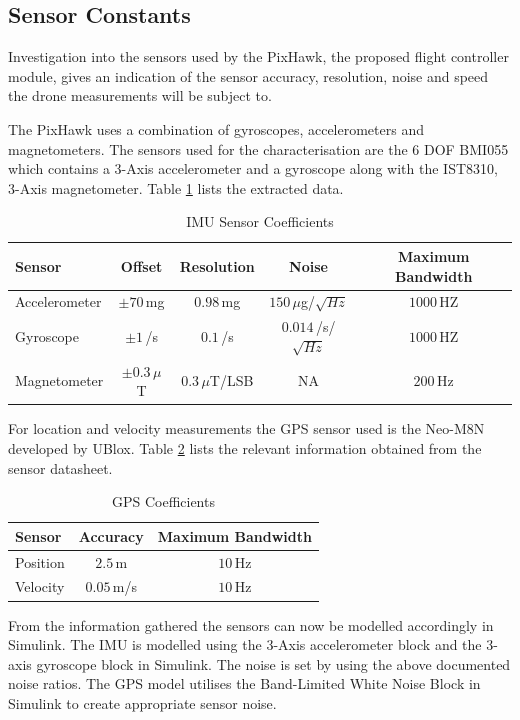 	\subsection{Sensor Constants}
	Investigation into the sensors used by the PixHawk, the proposed flight controller module, gives an indication of the sensor accuracy, resolution, noise and speed the drone measurements will be subject to.
	
	The PixHawk uses a combination of gyroscopes, accelerometers and magnetometers. The sensors used for the characterisation are the 6 DOF BMI055 which contains a 3-Axis accelerometer and a gyroscope along with the IST8310, 3-Axis magnetometer. Table \ref{tab:SensorCoeff} lists the extracted data.
	
	\begin{table}[H]
		\centering
		\begin{tabular}{l | c | c | c | c |}
			Sensor & Offset & Resolution & Noise & Maximum Bandwidth\\
			\hline\hline
			Accelerometer & $\pm70$\,mg & $0.98$\,mg & $150$\,$\mu$g/$\sqrt{Hz}$ & $1000$\,HZ\\
			Gyroscope & $\pm1$\,\textdegree/s & $0.1$\,\textdegree/s & $0.014$\,\textdegree/s/$\sqrt{Hz}$ & $1000$\,HZ\\
			Magnetometer & $\pm0.3$\,$\mu$T & $0.3$\,$\mu$T/LSB & NA & $200$\,Hz\\
		\end{tabular}
		\caption{IMU Sensor Coefficients}
		\label{tab:SensorCoeff}
	\end{table}
	
	For location and velocity measurements the GPS sensor used is the Neo-M8N developed by UBlox. Table \ref{tab:GPSCoeff} lists the relevant information obtained from the sensor datasheet.
	
	\begin{table}[H]
		\centering
		\begin{tabular}{l | c | c |}
			Sensor & Accuracy & Maximum Bandwidth\\
			\hline\hline
			Position & $2.5$\,m & $10$\,Hz\\
			Velocity & $0.05$\,m/s & $10$\,Hz\\
		\end{tabular}
		\caption{GPS Coefficients}
		\label{tab:GPSCoeff}
	\end{table}
	
	From the information gathered the sensors can now be modelled accordingly in Simulink. The IMU is modelled using the 3-Axis accelerometer block and the 3-axis gyroscope block in Simulink. The noise is set by using the above documented noise ratios. The GPS model utilises the Band-Limited White Noise Block in Simulink to create appropriate sensor noise. 

